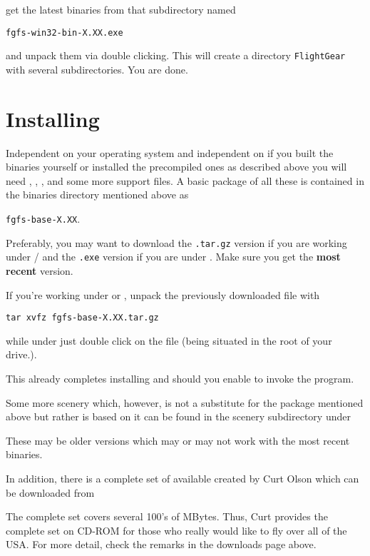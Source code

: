  \noindent
get the latest binaries from that subdirectory named

\texttt{fgfs-win32-bin-X.XX.exe}

 \noindent
and unpack them via double clicking. This will create a directory \texttt{FlightGear}
with several subdirectories. You are done.

\section{Installing }

Independent on your operating system and independent on if you built the binaries
yourself or installed the precompiled ones as described above you will need
, , , and some more support files. A basic
package of all these is contained in the binaries directory mentioned above as

 \texttt{fgfs-base-X.XX}.

 \noindent
 Preferably, you may want to download the \texttt{.tar.gz} version
if you are working under / and the \texttt{.exe} version if you
are under . Make sure you get the \textbf{most recent} version.

If you're working under  or , unpack the
previously downloaded file with

        \texttt{tar xvfz fgfs-base-X.XX.tar.gz}

 \noindent
while under  just double click on the file (being situated in the
root of your \FlightGear drive.).

This already completes installing \FlightGear and should you enable to invoke the
program.

Some more scenery which, however, is not a substitute for the
package mentioned above but rather is based on it can be found in
the scenery subdirectory under


 \noindent
These may be older versions which may or may not work with the
most recent binaries.

In addition, there is a complete set of 
available created by Curt Olson which can be
downloaded from


 \noindent
The complete set covers several 100's of MBytes. Thus, Curt
provides the complete set on CD-ROM for those who really would
like to fly over all of the USA. For more detail, check the
remarks in the downloads page above.

